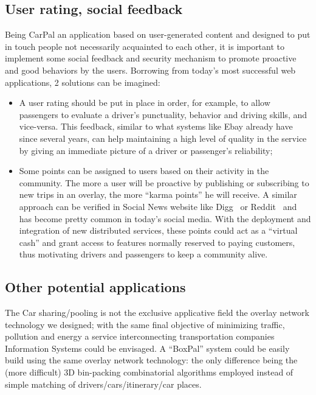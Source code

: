 \subsection{User rating, social feedback}
%
Being CarPal an application based on user-generated content and
designed to put in touch people not necessarily acquainted to each
other, it is important to implement some social feedback and security
mechanism to promote proactive and good behaviors by the users.
Borrowing from today's most successful web applications, 2 solutions
can be imagined:
%
\begin{itemize}
\item A user rating should be put in place in order, for example, to
  allow passengers to evaluate a driver's punctuality, behavior and
  driving skills, and vice-versa. This feedback, similar to what
  systems like Ebay already have since several years, can help
  maintaining a high level of quality in the service by giving an
  immediate picture of a driver or passenger's reliability;

\item Some points can be assigned to users based on their activity in
  the community. The more a user will be proactive by publishing or
  subscribing to new trips in an overlay, the more ``karma points'' he
  will receive.  A similar approach can be verified in Social News
  website like Digg~\cite{Digg} or Reddit~\cite{Reddit} and has become
  pretty common in today's social media.  With the deployment and
  integration of new distributed services, these points could act as a
  ``virtual cash'' and grant access to features normally reserved to
  paying customers, thus motivating drivers and passengers to keep a
  community alive.
\end{itemize}

\subsection{Other potential applications}
%
The Car sharing/pooling is not the exclusive applicative field the
overlay network technology we designed; with the same final objective
of minimizing traffic, pollution and energy a service interconnecting
transportation companies Information Systems could be envisaged. A
``BoxPal'' system could be easily build using the same overlay network
technology: the only difference being the (more difficult) 3D
bin-packing combinatorial algorithms employed instead of simple
matching of drivers/cars/itinerary/car places.


